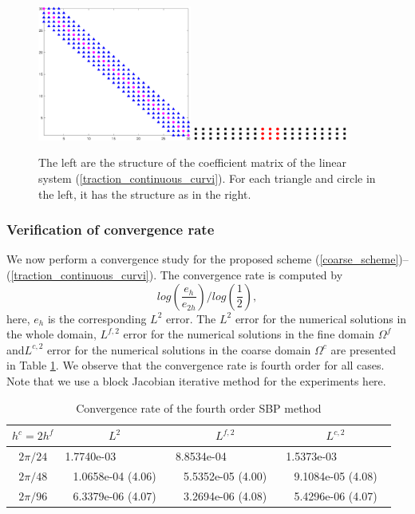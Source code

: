 \documentclass[a4paper]{article}
\begin{document}
\begin{figure}[H]
	\centering
	\includegraphics[width=0.45\textwidth]{Mass_matrix.eps}
	\includegraphics[width=0.45\textwidth]{Mass_block_diagonal.eps}
	\caption{\scriptsize{The left are the structure of the coefficient matrix of the linear system (\ref{traction_continuous_curvi}). For each triangle and circle in the left, it has the structure as in the right.}}\label{Mass_matrix}
\end{figure}

\subsubsection{Verification of convergence rate}\label{convergence_study}
We now perform a convergence study for the proposed scheme (\ref{coarse_scheme})--(\ref{traction_continuous_curvi}). The convergence rate is computed by
\[log\left(\frac{e_h}{e_{2h}}\right)\Bigg/log\left(\frac{1}{2}\right),\]
here, $e_h$ is the corresponding $L^2$ error.  The $L^2$ error for the numerical solutions in the whole domain, $L^{f,2}$ error for the numerical solutions in the fine domain $\Omega^f$ and$L^{c,2}$ error for the numerical solutions in the coarse domain $\Omega^c$ are presented in Table \ref{convergence_rate}. We observe that the convergence rate is fourth order for all cases. Note that we use a block Jacobian iterative method for the experiments here.

\begin{table}[htb]
	\begin{center}
		\begin{tabular}{|c|c c c|}
			\hline
		    $h^c = 2h^f$   & $L^2$ & $L^{f,2}$ & $L^{c,2}$  \\
			\hline
			$2\pi/24$ &1.7740e-03 ~~~~~~~~ & 8.8534e-04 ~~~~~~~~ & 1.5373e-03 ~~~~~~~~\\
			\hline
			$2\pi/48$ &1.0658e-04 (4.06) & 5.5352e-05 (4.00) & 9.1084e-05 (4.08)\\
			\hline 
			$2\pi/96$ &6.3379e-06 (4.07) & 3.2694e-06 (4.08) & 5.4296e-06 (4.07)\\
			\hline
		\end{tabular}
	\end{center}
  \caption{Convergence rate of the fourth order SBP method}\label{convergence_rate}
\end{table} 
\end{document}

